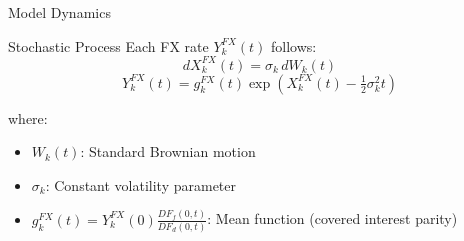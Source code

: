 \documentclass[11pt,aspectratio=169]{beamer}
\begin{document}
	\begin{frame}{Model Dynamics}
		\begin{block}{Stochastic Process}
			Each FX rate $Y_k^{FX}(t)$ follows:
			\begin{equation*}
				dX_k^{FX}(t) = \sigma_k\,dW_k(t)
			\end{equation*}
			\begin{equation*}
				Y_k^{FX}(t) = g_k^{FX}(t)\exp\!\left(X_k^{FX}(t) - \tfrac{1}{2}\sigma_k^2 t\right)
			\end{equation*}
		\end{block}
		
		\vspace{0.2cm}
		
		where:
		\begin{itemize}
			\item $W_k(t)$: Standard Brownian motion
			\item $\sigma_k$: Constant volatility parameter
			\item $g_k^{FX}(t) = Y_k^{FX}(0)\frac{DF_f(0,t)}{DF_d(0,t)}$: Mean function (covered interest parity)
		\end{itemize}
	\end{frame}
	
\end{document}
